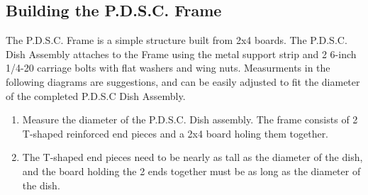 \documentclass{article}
\begin{document}
        \subsection{Building the P.D.S.C. Frame}
            The P.D.S.C. Frame is a simple structure built from 2x4 boards.  The P.D.S.C. Dish Assembly attaches to the Frame using the metal support strip and 2 6-inch 1/4-20 carriage bolts with flat washers and wing nuts.  Measurments in the following diagrams are suggestions, and can be easily adjusted to fit the diameter of the completed P.D.S.C Dish Assembly.
            \begin{enumerate}
                \item Measure the diameter of the P.D.S.C. Dish assembly. The frame consists of 2 T-shaped reinforced end pieces and a 2x4 board holing them together.
                \item The T-shaped end pieces need to be nearly as tall as the diameter of the dish, and the board holding the 2 ends together must be as long as the diameter of the dish.
            \end{enumerate}
\end{document}
